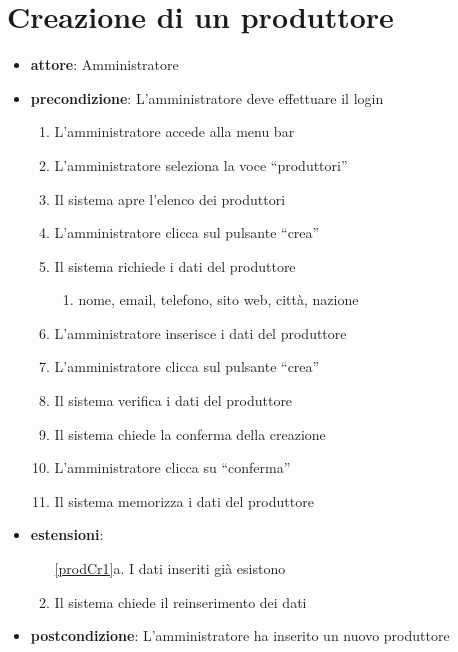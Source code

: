 \section{Creazione di un produttore}
\begin{itemize}
	\item \textbf{attore}: Amministratore
	\item \textbf{precondizione}: L’amministratore deve effettuare il login

	\begin{enumerate}
		\item L’amministratore accede alla menu bar
		\item L’amministratore seleziona la voce “produttori”
		\item Il sistema apre l’elenco dei produttori
		\item L’amministratore clicca sul pulsante “crea”
		\item Il sistema richiede i dati del produttore
		\begin{enumerate}
			\item nome, email, telefono, sito web, città, nazione
		\end{enumerate}
		\item L’amministratore inserisce i dati del produttore
		\item L’amministratore clicca sul pulsante “crea”
		\label{prodCr1}
		\item Il sistema verifica i dati del produttore
		\item Il sistema chiede la conferma della creazione
		\item L’amministratore clicca su “conferma”
		\item Il sistema memorizza i dati del produttore
	\end{enumerate}

	\item \textbf{estensioni}:
	\begin{enumerate}
		\item[\ref{prodCr1}a.] I dati inseriti già esistono
		\item Il sistema chiede il reinserimento dei dati
	\end{enumerate}

	\item \textbf{postcondizione}: L’amministratore ha inserito un nuovo produttore
\end{itemize}

		
